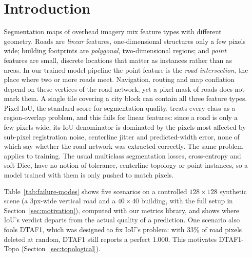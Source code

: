 \section{Introduction}
\label{sec:intro}

Segmentation maps of overhead imagery mix feature types with different geometry. Roads are
\emph{linear} features, one-dimensional structures only a few pixels wide; building footprints are
\emph{polygonal}, two-dimensional regions; and \emph{point} features are small, discrete locations
that matter as instances rather than as areas. In our trained-model pipeline the point feature is
the \emph{road intersection}, the place where two or more roads meet. Navigation, routing and map
conflation depend on these vertices of the road network, yet a pixel mask of roads does not mark
them. A single tile covering a city block can contain all three feature types. Pixel IoU, the
standard score for segmentation quality, treats every class as a region-overlap problem, and this
fails for linear features: since a road is only a few pixels wide, its IoU denominator is dominated
by the pixels most affected by sub-pixel registration noise, centerline jitter and predicted-width
error, none of which say whether the road network was extracted correctly. The same problem
applies to training. The usual multiclass segmentation losses, cross-entropy and soft Dice, have
no notion of tolerance, centerline topology or point instances, so a model trained with them is
only pushed to match pixels.

Table~\ref{tab:failure-modes} shows five scenarios on a controlled $128\times128$ synthetic scene
(a 3px-wide vertical road and a $40\times40$ building, with the full setup in
Section~\ref{sec:motivation}), computed with our metrics library, and shows where IoU's verdict
departs from the actual quality of a prediction. One scenario also fools DTAF1, which was designed
to fix IoU's problem: with 33\% of road pixels deleted at random, DTAF1 still reports a perfect
1.000. This motivates DTAF1-Topo
(Section~\ref{sec:topological}).

